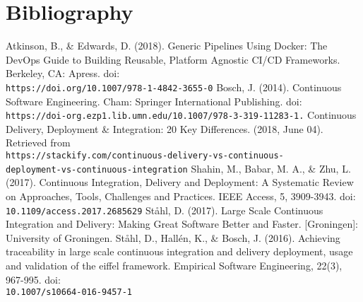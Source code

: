 \documentclass[11pt,a4paper]{article}
\begin{document}

\newpage
\section{Bibliography}
\begin{thebibliography}{6}
	 Atkinson, B., \& Edwards, D. (2018). Generic Pipelines Using Docker: The DevOps Guide to Building Reusable, Platform Agnostic CI/CD Frameworks. Berkeley, CA: Apress. doi:\\\texttt{https://doi.org/10.1007/978-1-4842-3655-0}
	 Bosch, J. (2014). Continuous Software Engineering. Cham: Springer International Publishing. doi:\\\texttt{https://doi-org.ezp1.lib.umn.edu/10.1007/978-3-319-11283-1.}
	 Continuous Delivery, Deployment \& Integration: 20 Key Differences. (2018, June 04). Retrieved from \\\texttt{https://stackify.com/continuous-delivery-vs-continuous-\\deployment-vs-continuous-integration}
	 Shahin, M., Babar, M. A., \& Zhu, L. (2017). Continuous Integration, Delivery and Deployment: A Systematic Review on Approaches, Tools, Challenges and Practices. IEEE Access, 5, 3909-3943. doi:\\\texttt{10.1109/access.2017.2685629}
	 St\aa hl, D. (2017). Large Scale Continuous Integration and Delivery: Making Great Software Better and Faster. [Groningen]: University of Groningen.
	 St\aa hl, D., Hall\'{e}n, K., \& Bosch, J. (2016). Achieving traceability in large scale continuous integration and delivery deployment, usage and validation of the eiffel framework. Empirical Software Engineering, 22(3), 967-995. doi:\\\texttt{10.1007/s10664-016-9457-1}
\end{thebibliography}
\end{document}
